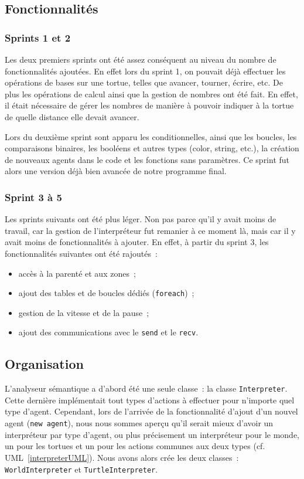\subsection{Fonctionnalités}

\subsubsection{Sprints 1 et 2}
Les deux premiers sprints ont été assez conséquent au niveau du nombre de fonctionnalités ajoutées.
En effet lors du sprint 1, on pouvait déjà effectuer les opérations de bases sur une tortue, telles que avancer, tourner, écrire, etc. De plus les opérations de calcul ainsi que la gestion de nombres ont été fait. En effet, il était nécessaire de gérer les nombres de manière à pouvoir indiquer à la tortue de quelle distance elle devait avancer.

Lors du deuxième sprint sont apparu les conditionnelles, ainsi que les boucles, les comparaisons binaires, les booléens et autres types (color, string, etc.), la création de nouveaux agents dans le code et les fonctions sans paramètres. Ce sprint fut alors une version déjà bien avancée de notre programme final.

\subsubsection{Sprint 3 à 5}
Les sprints suivants ont été plus léger. Non pas parce qu'il y avait moins de travail, car la gestion de l'interpréteur fut remanier à ce moment là, mais car il y avait moins de fonctionnalités à ajouter. En effet, à partir du sprint 3, les fonctionnalités suivantes ont été rajoutés~:
\begin{itemize}
\item accès à la parenté et aux zones~;
\item ajout des tables et de boucles dédiés (\verb|foreach|)~;
\item gestion de la vitesse et de la pause~;
\item ajout des communications avec le \verb|send| et le \verb|recv|.
\end{itemize}

\subsection{Organisation}

L'analyseur sémantique a d'abord été une seule classe~: la classe \verb|Interpreter|.
Cette dernière implémentait tout types d'actions à effectuer pour n'importe quel type d'agent.
Cependant, lors de l'arrivée de la fonctionnalité d'ajout d'un nouvel agent (\verb|new agent|), nous nous sommes aperçu qu'il serait mieux d'avoir un interpréteur par type d'agent, ou plus précisement un interpréteur pour le monde, un pour les tortues et un pour les actions communes aux deux types (cf. UML~\ref{interpreterUML}).
Nous avons alors crée les deux classes~: \verb|WorldInterpreter| et \verb|TurtleInterpreter|.

